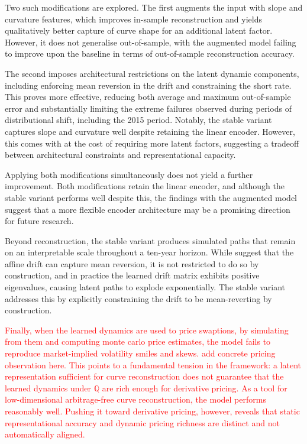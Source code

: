 Two such modifications are explored. The first augments the input with slope and curvature features, which improves in-sample reconstruction and yields qualitatively better capture of curve shape for an additional latent factor. However, it does not generalise out-of-sample, with the augmented model failing to improve upon the baseline in terms of out-of-sample reconstruction accuracy.

The second imposes architectural restrictions on the latent dynamic components, including enforcing mean reversion in the drift and constraining the short rate. This proves more effective, reducing both average and maximum out-of-sample error and substantially limiting the extreme failures observed during periods of distributional shift, including the 2015 period. Notably, the stable variant captures slope and curvature well despite retaining the linear encoder. However, this comes with at the cost of requiring more latent factors, suggesting a tradeoff between architectural constraints and representational capacity.

Applying both modifications simultaneously does not yield a further improvement. Both modifications retain the linear encoder, and although the stable variant performs well despite this, the findings with the augmented model suggest that a more flexible encoder architecture may be a promising direction for future research. 


Beyond reconstruction, the stable variant produces simulated paths that remain on an interpretable scale throughout a ten-year horizon. While \citet{MatinWanPoulsen2025} suggest that the affine drift can capture mean reversion, it is not restricted to do so by construction, and in practice the learned drift matrix exhibits positive eigenvalues, causing latent paths to explode exponentially. The stable variant addresses this by explicitly constraining the drift to be mean-reverting by construction.

\textcolor{red}{Finally, when the learned dynamics are used to price swaptions, by simulating from them and computing monte carlo price estimates, the model fails to reproduce market-implied volatility smiles and skews. add concrete pricing observation here. This points to a fundamental tension in the framework: a latent representation sufficient for curve reconstruction does not guarantee that the learned dynamics under $\mathbb{Q}$ are rich enough for derivative pricing. As a tool for low-dimensional arbitrage-free curve reconstruction, the model performs reasonably well. Pushing it toward derivative pricing, however, reveals that static representational accuracy and dynamic pricing richness are distinct and not automatically aligned.}



